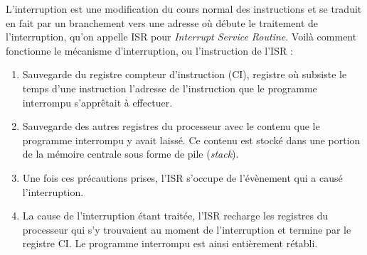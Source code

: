 \documentclass[12pt,a4paper]{report}
\begin{document}
L'interruption est une modification du cours normal des instructions et se traduit en fait par un branchement vers une adresse où débute le traitement de l'interruption, qu'on appelle ISR pour \textit{Interrupt Service Routine}. Voilà comment fonctionne le mécanisme d'interruption, ou l'instruction de l'ISR :
\begin{enumerate}
\item Sauvegarde du registre compteur d'instruction (CI), registre où subsiste le temps d'une instruction l'adresse de l'instruction que le programme interrompu s'apprêtait à effectuer.
\item Sauvegarde des autres registres du processeur avec le contenu que le programme interrompu y avait laissé. Ce contenu est stocké dans une portion de la mémoire centrale sous forme de pile (\textit{stack}).
\item Une fois ces précautions prises, l'ISR s'occupe de l'évènement qui a causé l'interruption.
\item La cause de l'interruption étant traitée, l'ISR recharge les registres du processeur qui s'y trouvaient au moment de l'interruption et termine par le registre CI. Le programme interrompu est ainsi entièrement rétabli.
\end{enumerate}
\end{document}
